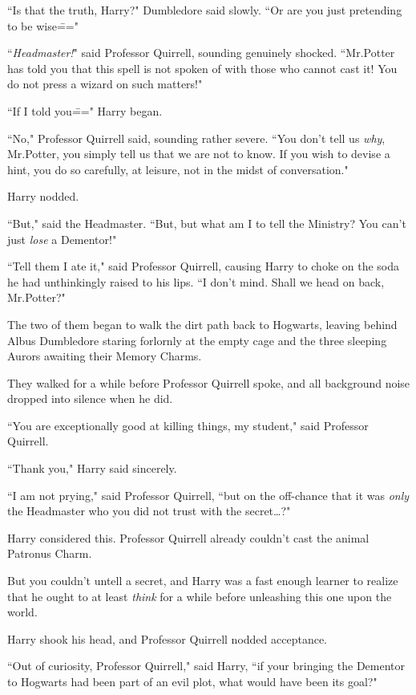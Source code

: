 ``Is that the truth, Harry?" Dumbledore said slowly. ``Or are you just pretending to be wise\==="

``\emph{Headmaster!}" said Professor Quirrell, sounding genuinely shocked. ``Mr.\?Potter has told you that this spell is not spoken of with those who cannot cast it! You do not press a wizard on such matters!"

``If I told you\===" Harry began.

``No," Professor Quirrell said, sounding rather severe. ``You don't tell us \emph{why}, Mr.\?Potter, you simply tell us that we are not to know. If you wish to devise a hint, you do so carefully, at leisure, not in the midst of conversation."

Harry nodded.

``But," said the Headmaster. ``But, but what am I to tell the Ministry? You can't just \emph{lose} a Dementor!"

``Tell them I ate it," said Professor Quirrell, causing Harry to choke on the soda he had unthinkingly raised to his lips. ``I don't mind. Shall we head on back, Mr.\?Potter?"

The two of them began to walk the dirt path back to Hogwarts, leaving behind Albus Dumbledore staring forlornly at the empty cage and the three sleeping Aurors awaiting their Memory Charms.


They walked for a while before Professor Quirrell spoke, and all background noise dropped into silence when he did.

``You are exceptionally good at killing things, my student," said Professor Quirrell.

``Thank you," Harry said sincerely.

``I am not prying," said Professor Quirrell, ``but on the off-chance that it was \emph{only} the Headmaster who you did not trust with the secret{\ldots}?"

Harry considered this. Professor Quirrell already couldn't cast the animal Patronus Charm.

But you couldn't untell a secret, and Harry was a fast enough learner to realize that he ought to at least \emph{think} for a while before unleashing this one upon the world.

Harry shook his head, and Professor Quirrell nodded acceptance.

``Out of curiosity, Professor Quirrell," said Harry, ``if your bringing the Dementor to Hogwarts had been part of an evil plot, what would have been its goal?"


